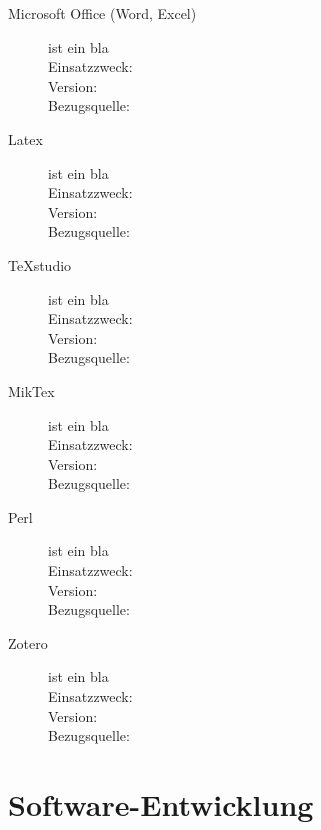 \documentclass[12pt, a4paper]{report}
\begin{document}
	\begin{description}
		\item [Microsoft Office (Word, Excel)] ist ein bla \\
		Einsatzzweck: \\
		Version: \\
		Bezugsquelle: \\
		
		
		\item [Latex] ist ein bla \\
		Einsatzzweck: \\
		Version: \\
		Bezugsquelle: \\
		
		
		\item [TeXstudio] ist ein bla \\
		Einsatzzweck: \\
		Version: \\
		Bezugsquelle: \\
		
		
		\item [MikTex] ist ein bla \\
		Einsatzzweck: \\
		Version: \\
		Bezugsquelle: \\
		
		
		\item [Perl] ist ein bla \\
		Einsatzzweck: \\
		Version: \\
		Bezugsquelle: \\
		
		
		\item [Zotero] ist ein bla \\
		Einsatzzweck: \\
		Version: \\
		Bezugsquelle: \\
	\end{description}
	
	
	
	\section{Software-Entwicklung}
	
\end{document}
